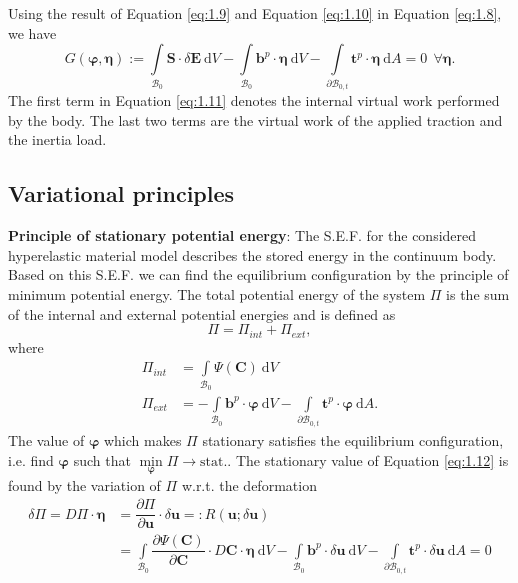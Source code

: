 \documentclass[11pt,a4paper,final]{article}
\begin{document}
Using the result of Equation \eqref{eq:1.9} and Equation \eqref{eq:1.10} in Equation \eqref{eq:1.8}, we have
\begin{equation}
G(\bm{\varphi},\bm{\eta}):= \int\limits_{\mathcal{B}_0} \mathbf{S} \cdot \delta \mathbf{E} \ \mathrm{d}V - \int\limits_{\mathcal{B}_0} \mathbf{b}^p \cdot \bm{\eta} \ \mathrm{d}V - \int\limits_{\mathcal{\partial B}_{0,t}} \mathbf{t}^p \cdot \bm{\eta} \ \mathrm{d}A = 0 \ \ \forall \bm{\eta}.
\label{eq:1.11}
\end{equation}
The first term in Equation \eqref{eq:1.11} denotes the internal virtual work performed by the body. The last two terms are the virtual work of the applied traction and the inertia load.

\subsection{Variational principles}
\textbf{Principle of stationary potential energy}: The S.E.F. for the considered hyperelastic material model describes the stored energy in the continuum body. Based on this S.E.F. we can find the equilibrium configuration by the principle of minimum potential energy. The total potential energy of the system $\Pi$ is the sum of the internal and external potential energies and is defined as 
\begin{equation}
\Pi = \Pi_{int} + \Pi_{ext},
\label{eq:1.12}
\end{equation}
where 
\begin{align}
\Pi_{int} &= \int\limits_{\mathcal{B}_0} \Psi (\mathbf{C}) \ \mathrm{d}V \\
\Pi_{ext} &= - \int\limits_{\mathcal{B}_0} \mathbf{b}^p \cdot \bm{\varphi} \ \mathrm{d}V - \int\limits_{\mathcal{\partial B}_{0,t}} \mathbf{t}^p \cdot \bm{\varphi} \ \mathrm{d}A.
\end{align}
The value of $\bm{\varphi}$ which makes $\Pi$ stationary satisfies the equilibrium configuration, i.e. find $\bm{\varphi}$ such that $\min\limits_{\bm{\varphi}} \Pi \to \text{stat.}$. The stationary value of Equation \eqref{eq:1.12} is found by the variation of $\Pi$ w.r.t. the deformation
\begin{align}
\delta \Pi = D \Pi \cdot \bm{\eta} &= \dfrac{\partial \Pi}{\partial \mathbf{u}} \cdot \delta \mathbf{u} =: R(\mathbf{u}; \delta \mathbf{u})\nonumber \\
&= \int\limits_{\mathcal{B}_0} \dfrac{\partial \Psi (\mathbf{C})}{\partial \mathbf{C}} \cdot D \mathbf{C} \cdot \bm{\eta} \ \mathrm{d}V - \int\limits_{\mathcal{B}_0} \mathbf{b}^p \cdot \delta \mathbf{u} \ \mathrm{d}V - \int\limits_{\mathcal{\partial B}_{0,t}} \mathbf{t}^p \cdot \delta \mathbf{u} \ \mathrm{d}A = 0
\end{align}
\end{document}
